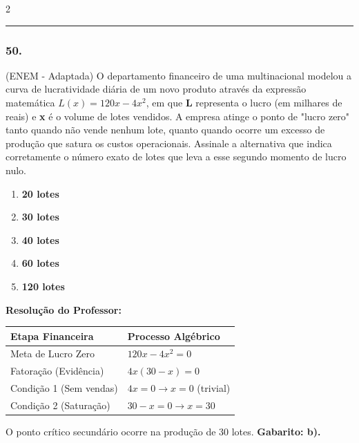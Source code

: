 \begin{multicols*}{2}
\par\vspace{\espacoQuestao}

\noindent\textcolor{CorLinha}{\rule{\linewidth}{0.5pt}} 
\par\vspace{\espacoPreQuestao}
\subsubsection*{50.} (ENEM - Adaptada) O departamento financeiro de uma multinacional modelou a curva de lucratividade diária de um novo produto através da expressão matemática $ L(x) = 120x - 4x^2 $, em que \textbf{L} representa o lucro (em milhares de reais) e \textbf{x} é o volume de lotes vendidos. A empresa atinge o ponto de "lucro zero" tanto quando não vende nenhum lote, quanto quando ocorre um excesso de produção que satura os custos operacionais. Assinale a alternativa que indica corretamente o número exato de lotes que leva a esse segundo momento de lucro nulo.
\begin{enumerate}[label=\alph*), itemsep=\espacoAlt]
    \item \textbf{20 lotes}
    \item \textbf{30 lotes}
    \item \textbf{40 lotes}
    \item \textbf{60 lotes}
    \item \textbf{120 lotes}
\end{enumerate}

\ifgabarito
    \begin{tcolorbox}[colback=CorTitUm!5, colframe=CorTitUm, boxrule=1pt, arc=4pt, left=6pt, right=6pt, top=6pt, bottom=6pt]
    \small\textbf{\textcolor{CorTitUm}{Resolução do Professor:}}\par\vspace{0.1cm}
    \color{CinzaEscuro}
    \begin{center}
    \begin{tabular}{|l|l|}
    \hline
    \textbf{Etapa Financeira} & \textbf{Processo Algébrico} \\
    \hline
    Meta de Lucro Zero & $120x - 4x^2 = 0$ \\
    \hline
    Fatoração (Evidência) & $4x(30 - x) = 0$ \\
    \hline
    Condição 1 (Sem vendas) & $4x = 0 \rightarrow x = 0$ (trivial) \\
    \hline
    Condição 2 (Saturação) & $30 - x = 0 \rightarrow x = 30$ \\
    \hline
    \end{tabular}
    \end{center}
    \vspace{0.1cm}
    O ponto crítico secundário ocorre na produção de 30 lotes. \textbf{Gabarito: b).}
    \end{tcolorbox}
\fi


\end{multicols*}
